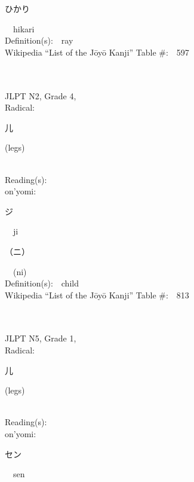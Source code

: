 \begin{multicols}{2}
{\hspace*{2em}}{\begin{CJK}{UTF8}{min} ひかり \end{CJK}}\ \ hikari\ \ \\
Definition(s):\ \ ray \\
Wikipedia ``List of the J\=oy\=o Kanji'' Table \#:\ \ 597 \\
\ \ \\
{\fontsize{34pt}{40pt}  }\ \ \\  %
{JLPT N2, Grade 4, \\Radical:\ \ {\begin{CJK}{UTF8}{min} 儿 \end{CJK}} (legs) } \\
Reading(s):\ \ \\
{\hspace*{1em}}on'yomi:\ \ \\
{\hspace*{2em}}{\begin{CJK}{UTF8}{min} ジ \end{CJK}}\ \ ji\ \ \\
{\hspace*{2em}}{\begin{CJK}{UTF8}{min} （ニ） \end{CJK}}\ \ (ni)\ \ \\
Definition(s):\ \ child \\
Wikipedia ``List of the J\=oy\=o Kanji'' Table \#:\ \ 813 \\
\ \ \\
{\fontsize{34pt}{40pt}  }\ \ \\  %
{JLPT N5, Grade 1, \\Radical:\ \ {\begin{CJK}{UTF8}{min} 儿 \end{CJK}} (legs) } \\
Reading(s):\ \ \\
{\hspace*{1em}}on'yomi:\ \ \\
{\hspace*{2em}}{\begin{CJK}{UTF8}{min} セン \end{CJK}}\ \ sen\ \ \\

\end{multicols}
